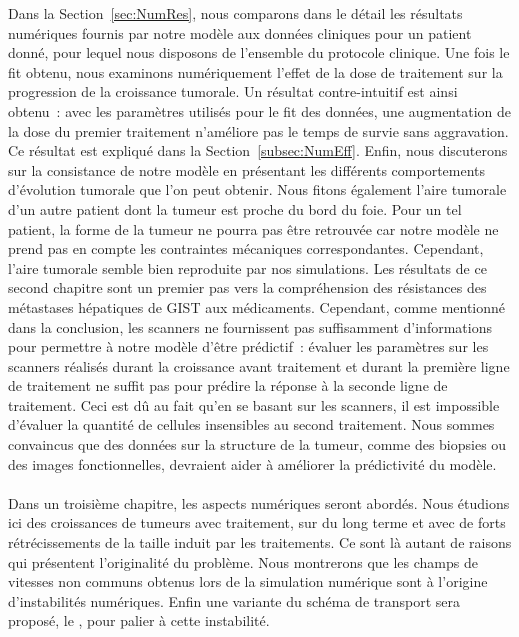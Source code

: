 \documentclass[main.tex]{subfiles}
\begin{document}
Dans la Section~\ref{sec:NumRes}, nous comparons dans le détail les résultats numériques fournis par notre modèle aux données cliniques pour un patient donné, pour lequel nous disposons de l'ensemble du protocole clinique. 
Une fois le fit obtenu, nous examinons numériquement l'effet de la dose de traitement sur la progression de la croissance tumorale. Un résultat contre-intuitif est ainsi obtenu~: avec les paramètres utilisés pour le fit des données, une augmentation de la dose du premier traitement n'améliore pas le temps de survie sans aggravation. Ce résultat est expliqué dans la Section~\ref{subsec:NumEff}. 
Enfin, nous discuterons sur la consistance de notre modèle en présentant les différents comportements d'évolution tumorale que l'on peut obtenir. 
Nous fitons également l'aire tumorale d'un autre patient dont la tumeur est proche du bord du foie. 
Pour un tel patient, la forme de la tumeur ne pourra pas être retrouvée car notre modèle ne prend pas en compte les contraintes mécaniques correspondantes. Cependant, l'aire tumorale semble bien reproduite par nos simulations. 
Les résultats de ce second chapitre sont un premier pas vers la compréhension des résistances des métastases hépatiques de GIST aux médicaments. Cependant, comme mentionné dans la conclusion, les scanners ne fournissent pas suffisamment d'informations pour permettre à notre modèle d'être prédictif~: évaluer les paramètres sur les scanners réalisés durant la croissance avant traitement et durant la première ligne de traitement ne suffit pas pour prédire la réponse à la seconde ligne de traitement. Ceci est dû au fait qu'en se basant sur les scanners, il est impossible d'évaluer la quantité de cellules insensibles au second traitement. Nous sommes convaincus que des données sur la structure de la tumeur, comme des biopsies ou des images fonctionnelles, devraient aider à améliorer la prédictivité du modèle.


\paragraph{}
Dans un troisième chapitre, les aspects numériques seront abordés. 
Nous étudions ici des croissances de tumeurs avec traitement, sur du long terme et avec de forts rétrécissements de la taille induit par les traitements. Ce sont là autant de raisons qui présentent l'originalité du problème. Nous montrerons que les champs de vitesses non communs obtenus lors de la simulation numérique  sont à l'origine d'instabilités numériques. 
Enfin une variante du schéma de transport sera proposé, le \twinweno, pour palier à cette instabilité.
\end{document}
